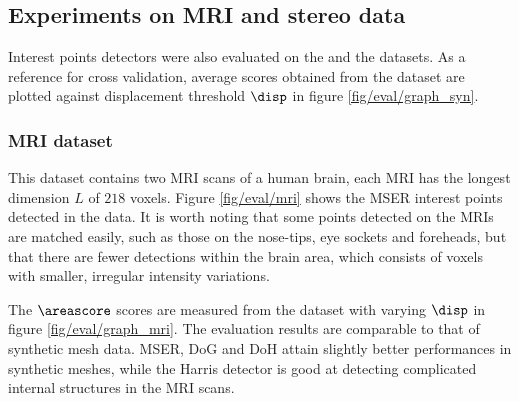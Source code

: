 \subsection{Experiments on MRI and stereo data}

Interest points detectors were also evaluated on the \mriset and the \stereoset datasets. As a reference for cross validation, average scores obtained from the \meshset dataset are plotted against displacement threshold $\disp$ in figure \ref{fig/eval/graph_syn}. 

\subsubsection{MRI dataset} This dataset contains two MRI scans of a human brain, each MRI has the longest dimension $L$ of $218$ voxels.
Figure \ref{fig/eval/mri} shows the MSER interest points detected in the data. It is worth noting that some points detected on the MRIs are matched easily, such as those on the nose-tips, eye sockets and foreheads, but that there are fewer detections within the brain area, which consists of voxels with smaller, irregular intensity variations.

The $\areascore$ scores are measured from the \mriset dataset with varying $\disp$ in figure \ref{fig/eval/graph_mri}. The evaluation results are comparable to that of synthetic mesh data. MSER, DoG and DoH attain slightly better performances in synthetic meshes, while the Harris detector is good at detecting complicated internal structures in the MRI scans. 

